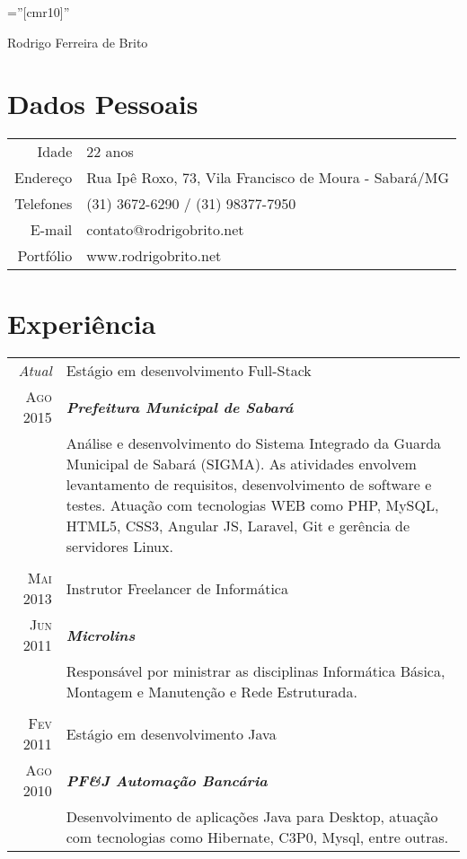 \documentclass[a4paper,10pt]{article}
\begin{document}
\pagestyle{empty} %

\font\fb=''[cmr10]'' %

\vspace*{-1cm}
\par{\centering
	{\Huge Rodrigo Ferreira de Brito
}\bigskip\par}

\section{Dados Pessoais}

\begin{tabular}{rl}
Idade & 22 anos\\
Endereço & Rua Ipê Roxo, 73, Vila Francisco de Moura - Sabará/MG\\    
Telefones & (31) 3672-6290 / (31) 98377-7950\\
E-mail & contato@rodrigobrito.net\\
Portfólio & www.rodrigobrito.net\\
\end{tabular}

\section{Experiência}
\begin{tabular}{r|p{13.1cm}}
	\emph{Atual} & Estágio em desenvolvimento Full-Stack \\
	\textsc{Ago 2015}&\emph{\textbf{Prefeitura Municipal de Sabará}}\\
		 &\footnotesize{Análise e desenvolvimento do Sistema Integrado da Guarda Municipal de Sabará (SIGMA). As atividades envolvem levantamento de requisitos, desenvolvimento de software e testes. Atuação com tecnologias WEB como PHP, MySQL, HTML5, CSS3, Angular JS, Laravel, Git e gerência de servidores Linux.}\\
	\multicolumn{2}{c}{} \\
	\textsc{Mai 2013} & Instrutor Freelancer de Informática \\
		 \textsc{Jun 2011}&\emph{\textbf{Microlins}}\\
		 &\footnotesize{Responsável por ministrar as disciplinas Informática Básica, Montagem e Manutenção e Rede Estruturada.}\\
	\multicolumn{2}{c}{} \\
	\textsc{Fev 2011} & Estágio em desenvolvimento Java\\
		\textsc{Ago 2010}&\emph{\textbf{PF\&J Automação Bancária}}\\
		& \footnotesize{Desenvolvimento de aplicações Java para Desktop, atuação com tecnologias como Hibernate, C3P0, Mysql, entre outras.}
\end{tabular}
\end{document}
